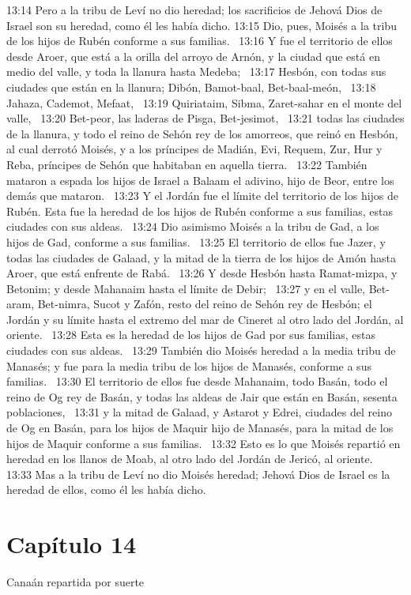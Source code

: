 13:14 Pero a la tribu de Leví no dio heredad; los sacrificios de Jehová Dios de Israel son su heredad, como él les había dicho. 
13:15 Dio, pues, Moisés a la tribu de los hijos de Rubén conforme a sus familias.  
13:16 Y fue el territorio de ellos desde Aroer, que está a la orilla del arroyo de Arnón, y la ciudad que está en medio del valle, y toda la llanura hasta Medeba;  
13:17 Hesbón, con todas sus ciudades que están en la llanura; Dibón, Bamot-baal, Bet-baal-meón,  
13:18 Jahaza, Cademot, Mefaat,  
13:19 Quiriataim, Sibma, Zaret-sahar en el monte del valle,  
13:20 Bet-peor, las laderas de Pisga, Bet-jesimot,  
13:21 todas las ciudades de la llanura, y todo el reino de Sehón rey de los amorreos, que reinó en Hesbón, al cual derrotó Moisés, y a los príncipes de Madián, Evi, Requem, Zur, Hur y Reba, príncipes de Sehón que habitaban en aquella tierra.  
13:22 También mataron a espada los hijos de Israel a Balaam el adivino, hijo de Beor, entre los demás que mataron.  
13:23 Y el Jordán fue el límite del territorio de los hijos de Rubén. Esta fue la heredad de los hijos de Rubén conforme a sus familias, estas ciudades con sus aldeas.  
13:24 Dio asimismo Moisés a la tribu de Gad, a los hijos de Gad, conforme a sus familias.  
13:25 El territorio de ellos fue Jazer, y todas las ciudades de Galaad, y la mitad de la tierra de los hijos de Amón hasta Aroer, que está enfrente de Rabá.  
13:26 Y desde Hesbón hasta Ramat-mizpa, y Betonim; y desde Mahanaim hasta el límite de Debir;  
13:27 y en el valle, Bet-aram, Bet-nimra, Sucot y Zafón, resto del reino de Sehón rey de Hesbón; el Jordán y su límite hasta el extremo del mar de Cineret al otro lado del Jordán, al oriente.  
13:28 Esta es la heredad de los hijos de Gad por sus familias, estas ciudades con sus aldeas.  
13:29 También dio Moisés heredad a la media tribu de Manasés; y fue para la media tribu de los hijos de Manasés, conforme a sus familias.  
13:30 El territorio de ellos fue desde Mahanaim, todo Basán, todo el reino de Og rey de Basán, y todas las aldeas de Jair que están en Basán, sesenta poblaciones,  
13:31 y la mitad de Galaad, y Astarot y Edrei, ciudades del reino de Og en Basán, para los hijos de Maquir hijo de Manasés, para la mitad de los hijos de Maquir conforme a sus familias.  
13:32 Esto es lo que Moisés repartió en heredad en los llanos de Moab, al otro lado del Jordán de Jericó, al oriente.  
13:33 Mas a la tribu de Leví no dio Moisés heredad; Jehová Dios de Israel es la heredad de ellos, como él les había dicho. 
\section*{Capítulo 14}
Canaán repartida por suerte  

